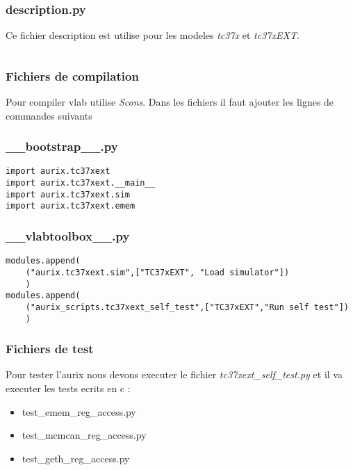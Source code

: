 \subsubsection*{description.py}
\label{anexe:tc37ex:description}
\begin{par}
Ce fichier description est utilise pour les modeles \textit{tc37x} et \textit{tc37xEXT}.
\end{par}
\inputminted[autogobble]{python}{anexes/tc37ex/description.py}

\subsubsection{Fichiers de compilation}
\label{anexe:tc37ex:compilation}
\begin{par}
Pour compiler vlab utilise \textit{Scons}. Dans les fichiers il faut ajouter les lignes de commandes suivants
\end{par}
\subsubsection*{\_\_bootstrap\_\_.py}
\begin{verbatim}
import aurix.tc37xext
import aurix.tc37xext.__main__
import aurix.tc37xext.sim
import aurix.tc37xext.emem
\end{verbatim}

\subsubsection*{\_\_vlabtoolbox\_\_.py}
\begin{verbatim}
modules.append(
    ("aurix.tc37xext.sim",["TC37xEXT", "Load simulator"])
    )
modules.append(
    ("aurix_scripts.tc37xext_self_test",["TC37xEXT","Run self test"])
    )
\end{verbatim}

\subsubsection{Fichiers de test}
\label{anexe:tc37ex:tests}
\begin{par}
Pour tester l'aurix nous devons executer le fichier \textit{tc37xext\_self\_test.py} et il va executer les tests ecrits en c :
\end{par}
\begin{itemize}
    \item test\_emem\_reg\_access.py
    \item test\_mcmcan\_reg\_access.py
    \item test\_geth\_reg\_access.py
\end{itemize}

